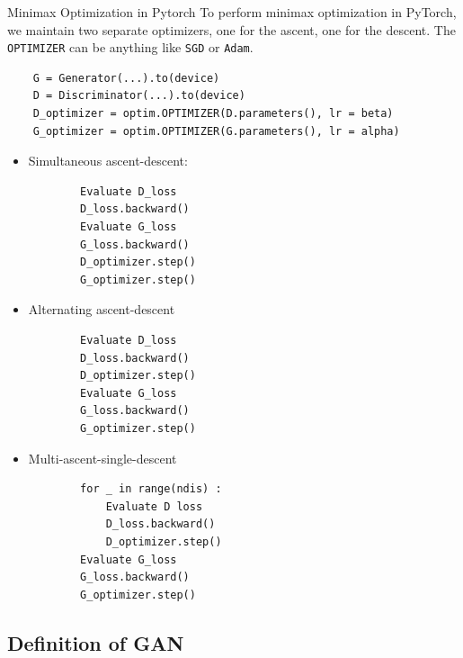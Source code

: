 \begin{frame}[allowframebreaks]

\begin{myconceptblock}{12.6}{Minimax Optimization in Pytorch}
    To perform minimax optimization in PyTorch, we maintain two separate optimizers, one for the ascent, one for the descent.
    The \verb|OPTIMIZER| can be anything like \verb|SGD| or \verb|Adam|.

    \begin{verbatim}
    G = Generator(...).to(device)
    D = Discriminator(...).to(device)
    D_optimizer = optim.OPTIMIZER(D.parameters(), lr = beta)
    G_optimizer = optim.OPTIMIZER(G.parameters(), lr = alpha)
    \end{verbatim}

    \begin{itemize}
        \item
        Simultaneous ascent-descent:

        \begin{verbatim}
        Evaluate D_loss
        D_loss.backward()
        Evaluate G_loss
        G_loss.backward()
        D_optimizer.step()
        G_optimizer.step()
        \end{verbatim}
        \item
        Alternating ascent-descent

        \begin{verbatim}
        Evaluate D_loss
        D_loss.backward()
        D_optimizer.step()
        Evaluate G_loss
        G_loss.backward()
        G_optimizer.step()
        \end{verbatim}
        \item
        Multi-ascent-single-descent

        \begin{verbatim}
        for _ in range(ndis) :
            Evaluate D loss
            D_loss.backward()
            D_optimizer.step()
        Evaluate G_loss
        G_loss.backward()
        G_optimizer.step()
        \end{verbatim}
    \end{itemize}
\end{myconceptblock}

\end{frame}

\subsection{Definition of GAN}



